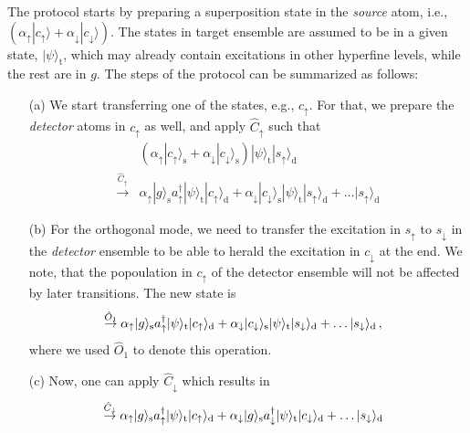 \documentclass[twocolumn,pra,aps,superscriptaddress,showpacs]{revtex4-1}
\newcommand{\ket}[1]{|#1\rangle}
\newcommand{\rs}{\mathrm{s}}
\newcommand{\rd}{\mathrm{d}}
\newcommand{\rt}{\mathrm{t}}
\begin{document}
The protocol starts by preparing a superposition state in the \emph{source} atom, i.e., $(\alpha_\uparrow \ket{c_\uparrow} + \alpha_\downarrow \ket{c_\downarrow})$. The states in target ensemble are assumed to be in a given state, $\ket{\psi}_\rt$, which may already contain excitations in other hyperfine levels, while the rest are in $g$. The steps of the protocol can be summarized as follows:
%
\begin{itemize}
	\item [(a)] We start transferring one of the states, e.g., $c_\uparrow$. For that, we prepare the \emph{detector} atoms in $c_\uparrow$ as well, and apply $\hat{C}_\uparrow$ such that
	\begin{align}
		& \left( \alpha_\uparrow \ket{c_\uparrow}_\rs + \alpha_\downarrow \ket{c_\downarrow}_\rs\right) \ket{\psi}_\rt \ket{s_\uparrow}_\rd \nonumber\\
		\stackrel{\hat{C}_\uparrow}{\rightarrow}
		& \alpha_\uparrow \ket{g}_\rs a_\uparrow^\dagger \ket{\psi}_\rt \ket{c_\uparrow}_\rd 
		+ \alpha_\downarrow \ket{c_\downarrow}_\rs \ket{\psi}_\rt \ket{s_\uparrow}_\rd + \ldots \ket{s_\uparrow}_\rd  \nonumber
	\end{align} 
	
	\item [(b)] For the orthogonal mode, we need to transfer the excitation in $s_\uparrow$ to $s_\downarrow$ in the \emph{detector} ensemble to be able to herald the excitation in $c_\downarrow$ at the end. We note, that the popoulation in $c_\uparrow$ of the detector ensemble will not be affected by later transitions. The new state is
	\begin{align}
		&\stackrel{\hat{O}_1}{\rightarrow}
		\alpha_\uparrow \ket{g}_\rs a_\uparrow^\dagger \ket{\psi}_\rt \ket{c_\uparrow}_\rd 
		+ \alpha_\downarrow \ket{c_\downarrow}_\rs \ket{\psi}_\rt \ket{s_\downarrow}_\rd 
		+ \ldots \ket{s_\downarrow}_\rd\,, \notag 
	\end{align} 
	where we used $\hat{O}_1$ to denote this operation. 
	
	\item [(c)] Now, one can apply $\hat{C}_\downarrow$ which results in
	\begin{align}
		&\stackrel{\hat{C}_\downarrow}{\rightarrow}
		 \alpha_\uparrow \ket{g}_\rs a_\uparrow^\dagger \ket{\psi}_\rt \ket{c_\uparrow}_\rd 
		+ \alpha_\downarrow \ket{g}_\rs a_\downarrow^\dagger \ket{\psi}_\rt \ket{c_\downarrow}_\rd 
		+ \ldots \ket{s_\downarrow}_\rd \notag 
 	\end{align} 
 

\end{itemize}
\end{document}
